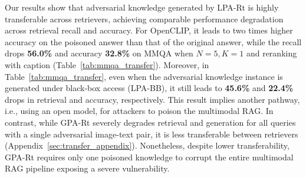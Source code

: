 Our results show that adversarial knowledge generated by LPA-Rt is highly transferable across retrievers, achieving comparable performance degradation across retrieval recall and accuracy. For OpenCLIP, it leads to two times higher accuracy on the poisoned answer than that of the original answer, while the recall drops \textbf{56.0\%} and accuracy \textbf{32.8\%} on MMQA when $N=5, K=1$ and reranking with caption (Table~\ref{tab:mmqa_transfer}). Moreover, in Table~\ref{tab:mmqa_transfer}, even when the adversarial knowledge instance is generated under black-box access (LPA-BB), it still leads to \textbf{45.6\%} and \textbf{22.4\%} drops in retrieval and accuracy, respectively. This result implies another pathway, i.e., using an open model, for attackers to poison the multimodal RAG. In contrast, while GPA-Rt severely degrades retrieval and generation for all queries with a single adversarial image-text pair, it is less transferable between retrievers (Appendix~\ref{sec:transfer_appendix}). Nonetheless, despite lower transferability, GPA-Rt requires only one poisoned knowledge to corrupt the entire multimodal RAG pipeline exposing a severe vulnerability.


